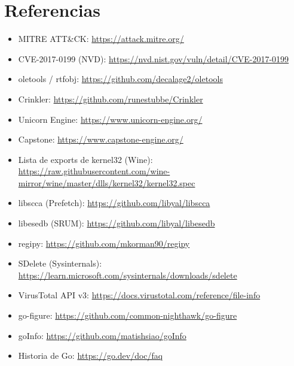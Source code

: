 \documentclass[11pt,a4paper]{article}
\begin{document}
\section{Referencias}
\begin{itemize}\small
  \item MITRE ATT\&CK: \url{https://attack.mitre.org/}
  \item CVE-2017-0199 (NVD): \url{https://nvd.nist.gov/vuln/detail/CVE-2017-0199}
  \item oletools / rtfobj: \url{https://github.com/decalage2/oletools}
  \item Crinkler: \url{https://github.com/runestubbe/Crinkler}
  \item Unicorn Engine: \url{https://www.unicorn-engine.org/}
  \item Capstone: \url{https://www.capstone-engine.org/}
  \item Lista de exports de kernel32 (Wine): \url{https://raw.githubusercontent.com/wine-mirror/wine/master/dlls/kernel32/kernel32.spec}
  \item libscca (Prefetch): \url{https://github.com/libyal/libscca}
  \item libesedb (SRUM): \url{https://github.com/libyal/libesedb}
  \item regipy: \url{https://github.com/mkorman90/regipy}
  \item SDelete (Sysinternals): \url{https://learn.microsoft.com/sysinternals/downloads/sdelete}
  \item VirusTotal API v3: \url{https://docs.virustotal.com/reference/file-info}
  \item go-figure: \url{https://github.com/common-nighthawk/go-figure}
  \item goInfo: \url{https://github.com/matishsiao/goInfo}
  \item Historia de Go: \url{https://go.dev/doc/faq}
\end{itemize}
\end{document}
